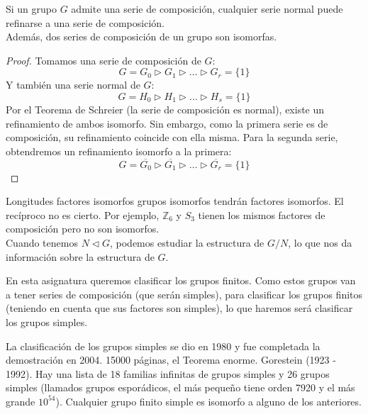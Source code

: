 \begin{teo}
    Si un grupo $G$ admite una serie de composición, cualquier serie normal puede refinarse a una serie de composición.\\

    \noindent
    Además, dos series de composición de un grupo son isomorfas.
    \begin{proof}
        Tomamos una serie de composición de $G$:
        \begin{equation*}
            G= G_0 \rhd G_1 \rhd \ldots \rhd G_r = \{1\}
        \end{equation*}
        Y también una serie normal de $G$:
        \begin{equation*}
            G=H_0 \rhd H_1 \rhd \ldots \rhd H_s = \{1\}
        \end{equation*}
        Por el Teorema de Schreier (la serie de composición es normal), existe un refinamiento de ambos isomorfo. Sin embargo, como la primera serie es de composición, su refinamiento coincide con ella misma. Para la segunda serie, obtendremos un refinamiento isomorfo a la primera:
        \begin{equation*}
            G = \overline{G_0} \rhd \overline{G_1} \rhd \ldots \rhd \overline{G_r} = \{1\}
        \end{equation*}
    \end{proof}
\end{teo}

Longitudes
factores isomorfos
grupos isomorfos tendrán factores isomorfos.
El recíproco no es cierto.
Por ejemplo, $\mathbb{Z}_6$ y $S_3$ tienen los mismos factores de composición pero no son isomorfos.\\

% 


\noindent
Cuando tenemos $N\lhd G$, podemos estudiar la estructura de $G/N$, lo que nos da información sobre la estructura de $G$.

En esta asignatura queremos clasificar los grupos finitos. Como estos grupos van a tener series de composición (que serán simples), para clasificar los grupos finitos (teniendo en cuenta que sus factores son simples), lo que haremos será clasificar los grupos simples.

La clasificación de los grupos simples se dio en 1980 y fue completada la demostración en 2004.
15000 páginas, el Teorema enorme. Gorestein (1923 - 1992).
Hay una lista de 18 familias infinitas de grupos simples y 26 grupos simples (llamados grupos esporádicos, el más pequeño tiene orden 7920 y el más grande $10^{54}$).
Cualquier grupo finito simple es isomorfo a alguno de los anteriores.\\

